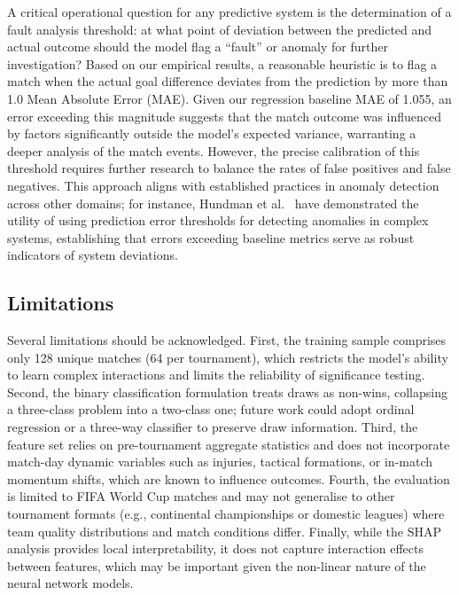 \documentclass[a4paper,twoside]{article}
\begin{document}
A critical operational question for any predictive system is the determination of a fault analysis threshold: at what point of deviation between the predicted and actual outcome should the model flag a ``fault'' or anomaly for further investigation? Based on our empirical results, a reasonable heuristic is to flag a match when the actual goal difference deviates from the prediction by more than 1.0 Mean Absolute Error (MAE). Given our regression baseline MAE of 1.055, an error exceeding this magnitude suggests that the match outcome was influenced by factors significantly outside the model's expected variance, warranting a deeper analysis of the match events. However, the precise calibration of this threshold requires further research to balance the rates of false positives and false negatives. This approach aligns with established practices in anomaly detection across other domains; for instance, Hundman et al.\ \cite{hundman_detecting_2018} have demonstrated the utility of using prediction error thresholds for detecting anomalies in complex systems, establishing that errors exceeding baseline metrics serve as robust indicators of system deviations.

\subsection{Limitations}

Several limitations should be acknowledged.
First, the training sample comprises only 128 unique matches (64 per tournament), which restricts the model's ability to learn complex interactions and limits the reliability of significance testing.
Second, the binary classification formulation treats draws as non-wins, collapsing a three-class problem into a two-class one; future work could adopt ordinal regression or a three-way classifier to preserve draw information.
Third, the feature set relies on pre-tournament aggregate statistics and does not incorporate match-day dynamic variables such as injuries, tactical formations, or in-match momentum shifts, which are known to influence outcomes.
Fourth, the evaluation is limited to FIFA World Cup matches and may not generalise to other tournament formats (e.g., continental championships or domestic leagues) where team quality distributions and match conditions differ.
Finally, while the SHAP analysis provides local interpretability, it does not capture interaction effects between features, which may be important given the non-linear nature of the neural network models.
\end{document}
